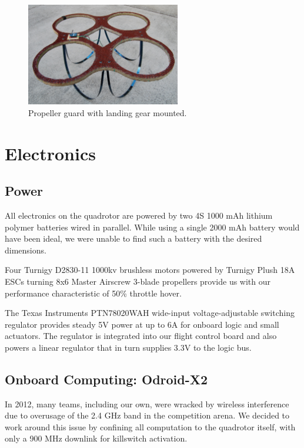 \documentclass[12pt,letterpaper]{article} \usepackage[margin=1in]{geometry}
\begin{document}
\begin{figure}[!h]
	\centering
	\includegraphics[width=0.6\textwidth]{img/prop_guard.jpg}
	\caption{Propeller guard with landing gear mounted.}
	\label{fig:feastress}
\end{figure}


\section*{Electronics}

\subsection*{Power}

All electronics on the quadrotor are powered by two 4S 1000 mAh lithium polymer
batteries wired in parallel. While using a single 2000 mAh battery would have
been ideal, we were unable to find such a battery with the desired dimensions.

Four Turnigy D2830-11 1000kv brushless motors powered by Turnigy Plush 18A ESCs
turning 8x6 Master Airscrew 3-blade propellers provide us with our performance
characteristic of 50\% throttle hover.

The Texas Instruments PTN78020WAH wide-input voltage-adjustable switching
regulator provides steady 5V power at up to 6A for onboard logic and small
actuators. The regulator is integrated into our flight control board and also
powers a linear regulator that in turn supplies 3.3V to the logic bus.


\subsection*{Onboard Computing: Odroid-X2}

In 2012, many teams, including our own, were wracked by wireless interference
due to overusage of the 2.4 GHz band in the competition arena. We decided to
work around this issue by confining all computation to the quadrotor itself,
with only a 900 MHz downlink for killswitch activation.
\end{document}
